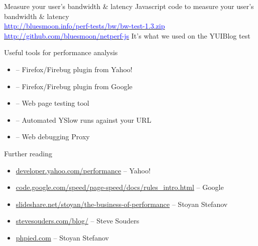 \documentclass{beamer}
\begin{document}
\begin{frame}{Measure your user's bandwidth \& latency}
  Javascript code to measure your user's bandwidth \& latency \\
  \href{http://bluesmoon.info/perf-tests/bw/bw-test-1.3.zip}{\textcolor{blue}{http://bluesmoon.info/perf-tests/bw/bw-test-1.3.zip}} \\
  \href{http://github.com/bluesmoon/netperf-js}{\textcolor{blue}{http://github.com/bluesmoon/netperf-js}}
  \vfill
  \tiny{It's what we used on the YUIBlog test}
\end{frame}

\begin{frame}{Useful tools for performance analysis}
  \begin{itemize}
  \item \href{http://developer.yahoo.com/yslow/}{} -- Firefox/Firebug plugin from Yahoo!
  \item \href{http://code.google.com/speed/page-speed/}{} -- Firefox/Firebug plugin from Google
  \item \href{http://www.webpagetest.org/}{} -- Web page testing tool
  \item \href{http://www.showslow.org/}{} -- Automated YSlow runs against your URL
  \item \href{http://www.fiddler2.com/fiddler2/}{} -- Web debugging Proxy
  \end{itemize}
\end{frame}

\begin{frame}{Further reading}
  \begin{itemize}
  \item \href{http://developer.yahoo.com/performance}{developer.yahoo.com/performance} -- Yahoo!
  \item \href{http://code.google.com/speed/page-speed/docs/rules_intro.html}{code.google.com/speed/page-speed/docs/rules\_intro.html} -- Google
  \item \href{http://www.slideshare.net/stoyan/the-business-of-performance}{slideshare.net/stoyan/the-business-of-performance} -- Stoyan Stefanov
  \item \href{http://stevesouders.com/blog/}{stevesouders.com/blog/} -- Steve Souders
  \item \href{http://phpied.com/}{phpied.com} -- Stoyan Stefanov
  \end{itemize}
\end{frame}
\end{document}
